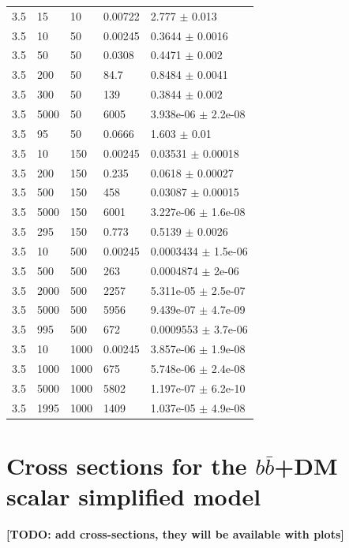\begin{longtable}{lllll}
	3.5 & 15 & 10 & 0.00722 & 2.777 $\pm$ 0.013 \\
	3.5 & 10 & 50 & 0.00245 & 0.3644 $\pm$ 0.0016 \\
	3.5 & 50 & 50 & 0.0308 & 0.4471 $\pm$ 0.002 \\
	3.5 & 200 & 50 & 84.7 & 0.8484 $\pm$ 0.0041 \\
	3.5 & 300 & 50 & 139 & 0.3844 $\pm$ 0.002 \\
	3.5 & 5000 & 50 & 6005 & 3.938e-06 $\pm$ 2.2e-08 \\
	3.5 & 95 & 50 & 0.0666 & 1.603 $\pm$ 0.01 \\
	3.5 & 10 & 150 & 0.00245 & 0.03531 $\pm$ 0.00018 \\
	3.5 & 200 & 150 & 0.235 & 0.0618 $\pm$ 0.00027 \\
	3.5 & 500 & 150 & 458 & 0.03087 $\pm$ 0.00015 \\
	3.5 & 5000 & 150 & 6001 & 3.227e-06 $\pm$ 1.6e-08 \\
	3.5 & 295 & 150 & 0.773 & 0.5139 $\pm$ 0.0026 \\
	3.5 & 10 & 500 & 0.00245 & 0.0003434 $\pm$ 1.5e-06 \\
	3.5 & 500 & 500 & 263 & 0.0004874 $\pm$ 2e-06 \\
	3.5 & 2000 & 500 & 2257 & 5.311e-05 $\pm$ 2.5e-07 \\
	3.5 & 5000 & 500 & 5956 & 9.439e-07 $\pm$ 4.7e-09 \\
	3.5 & 995 & 500 & 672 & 0.0009553 $\pm$ 3.7e-06 \\
	3.5 & 10 & 1000 & 0.00245 & 3.857e-06 $\pm$ 1.9e-08 \\
	3.5 & 1000 & 1000 & 675 & 5.748e-06 $\pm$ 2.4e-08 \\
	3.5 & 5000 & 1000 & 5802 & 1.197e-07 $\pm$ 6.2e-10 \\
	3.5 & 1995 & 1000 & 1409 & 1.037e-05 $\pm$ 4.9e-08 \\
\end{longtable}

\section{\texorpdfstring{Cross sections for the $b\bar b$+DM scalar simplified model}{Cross sections for the bbbar+DM scalar simplified model}}

\textbf{[TODO: add cross-sections, they will be available with plots]}


